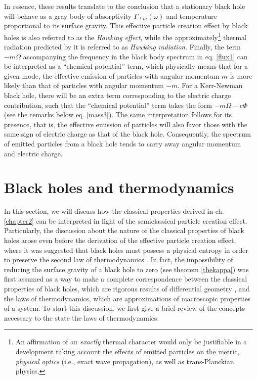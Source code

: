 \documentclass[
12pt,		%
openright,	%
twoside,  %
a4paper,			%
chapter=TITLE,		%
english,			%
french,				%
spanish,			%
brazil				%
]{USPSC-classe/USPSC}
\begin{document}
In essence, these results translate to the conclusion that a stationary black hole will behave as a gray body of absorptivity $\Gamma_{\ell m}(\omega)$ and temperature proportional to its surface gravity. This effective particle creation effect by black holes is also referred to as the \textit{Hawking effect}, while the approximately\footnote{An affirmation of an \textit{exactly} thermal character would only be justifiable in a development taking account the effects of emitted particles on the metric, \textit{physical optics} (i.e., exact wave propagation), as well as trans-Planckian physics.} thermal radiation predicted by it is referred to as \textit{Hawking radiation}. Finally, the term $-m\Omega$ accompanying the frequency in the black body spectrum in eq. \ref{flux1} can be interpreted as a ``chemical potential'' term, which physically means that for a given mode, the effective emission of particles with angular momentum $m$ is more likely than that of particles with angular momentum $-m$. For a Kerr-Newman black hole, there will be an extra term corresponding to the electric charge contribution, such that the ``chemical potential'' term takes the form $-m\Omega-e\Phi$ (see the remarks below eq. \ref{mass3}). The same interpretation follows for its presence, that is, the effective emission of particles will also favor those with the same sign of electric charge as that of the black hole. Consequently, the spectrum of emitted particles from a black hole tends to carry away angular momentum and electric charge.

\section{Black holes and thermodynamics}\label{thermo}

In this section, we will discuss how the classical properties derived in ch. \ref{chapter2} can be interpreted in light of the semiclassical particle creation effect. Particularly, the discussion about the nature of the classical properties of black holes arose even before the derivation of the effective particle creation effect, where it was suggested that black holes must possess a physical entropy in order to preserve the second law of thermodynamics \cite{Bekenstein1972, Bekenstein1973, Bekenstein1974}. In fact, the impossibility of reducing the surface gravity of a black hole to zero (see theorem \ref{thekappa}) was first assumed \cite{Bardeen1973} as a way to make a complete correspondence between the classical properties of black holes, which are rigorous results of differential geometry \cite{Bekenstein1980,Wald2001}, and the laws of thermodynamics, which are approximations of macroscopic properties of a system. To start this discussion, we first give a brief review of the concepts necessary to the state the laws of thermodynamics.
\end{document}
